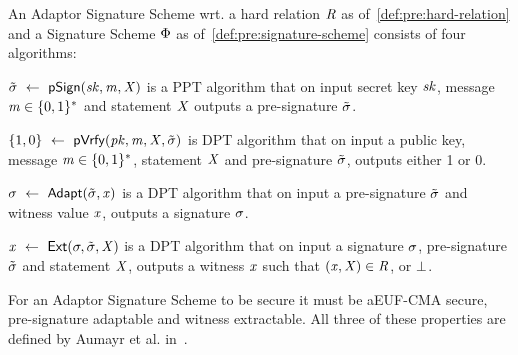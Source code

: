 \begin{definition}\label{def:pre:script:apt}
    An Adaptor Signature Scheme wrt. a hard relation $\mathit{R}$ as of~\cref{def:pre:hard-relation} and a Signature Scheme $\Phi$ as of~\cref{def:pre:signature-scheme} consists of four algorithms:
    \begin{asparaitem}
        \item $\tilde{\sigma} ~\leftarrow~ \mathsf{pSign}(\mathit{sk}, \mathit{m}, \mathit{X})$ is a PPT algorithm that on input secret key $\mathit{sk}$, message $\mathit{m} \in \{0,1\}^{*}$ and statement $\mathit{X}$ outputs a pre-signature $\tilde{\sigma}$.
        \item $\{1,0\} ~\leftarrow~ \mathsf{pVrfy}(\mathit{pk}, \mathit{m}, \mathit{X}, \tilde{\sigma})$ is DPT algorithm that on input a public key, message $\mathit{m} \in \{0,1\}^{*}$, statement $\mathit{X}$ and pre-signature $\tilde{\sigma}$, outputs either 1 or 0.
        \item $\sigma ~\leftarrow~ \mathsf{Adapt}(\tilde{\sigma}, \mathit{x})$ is a DPT algorithm that on input a pre-signature $\tilde{\sigma}$ and witness value $\mathit{x}$, outputs a signature $\sigma$.
        \item $\mathit{x} ~\leftarrow~ \mathsf{Ext}(\sigma, \tilde{\sigma}, \mathit{X})$ is a DPT algorithm that on input a signature $\sigma$, pre-signature $\tilde{\sigma}$ and statement $\mathit{X}$, outputs a witness $\mathit{x}$ such that $(\mathit{x}, \mathit{X}) \in \mathit{R}$, or $\bot$.
    \end{asparaitem}
\end{definition}

For an Adaptor Signature Scheme to be secure it must be aEUF-CMA secure, pre-signature adaptable and witness extractable.
All three of these properties are defined by Aumayr et al. in~\cite{aumayr2020bitcoinchannels}.
